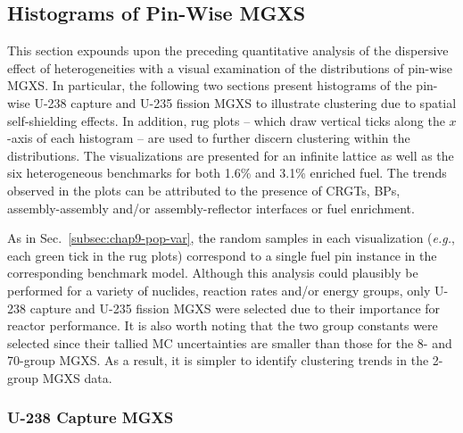 \subsection{Histograms of Pin-Wise MGXS}
\label{subsec:chap9-histograms}

This section expounds upon the preceding quantitative analysis of the dispersive effect of heterogeneities with a visual examination of the distributions of pin-wise \ac{MGXS}. In particular, the following two sections present histograms of the pin-wise U-238 capture and U-235 fission \ac{MGXS} to illustrate clustering due to spatial self-shielding effects. In addition, rug plots -- which draw vertical ticks along the $x$-axis of each histogram -- are used to further discern clustering within the distributions. The visualizations are presented for an infinite lattice as well as the six heterogeneous benchmarks for both 1.6\% and 3.1\% enriched fuel. The trends observed in the plots can be attributed to the presence of \acp{CRGT}, \acp{BP}, assembly-assembly and/or assembly-reflector interfaces or fuel enrichment.

As in Sec.~\ref{subsec:chap9-pop-var}, the random samples in each visualization (\textit{e.g.}, each green tick in the rug plots) correspond to a single fuel pin instance in the corresponding benchmark model. Although this analysis could plausibly be performed for a variety of nuclides, reaction rates and/or energy groups, only U-238 capture and U-235 fission \ac{MGXS} were selected due to their importance for reactor performance. It is also worth noting that the two group constants were selected since their tallied \ac{MC} uncertainties are smaller than those for the 8- and 70-group \ac{MGXS}. As a result, it is simpler to identify clustering trends in the 2-group \ac{MGXS} data.

\subsubsection{U-238 Capture MGXS}
\label{subsubsec:chap9-histograms-capt}

